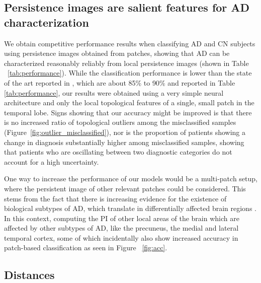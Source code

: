\documentclass{article}
\begin{document}
\subsection{Persistence images are salient features for AD characterization}

We obtain competitive performance results when classifying AD and CN subjects using persistence images obtained from patches, showing that AD can be characterized reasonably reliably from local persistence images (shown in Table ~\ref{tab:performance}). While the classification performance is lower than the state of the art reported in \citep{liu2018anatomical}, which are about 85\% to 90\% and reported in Table \ref{tab:performance}, our results were obtained using a very simple neural architecture and only the local topological features of a single, small patch in the temporal lobe. Signs showing that our accuracy might be improved is that there is no increased ratio of topological outliers among the misclassified samples (Figure~\ref{fig:outlier_misclassified}), nor is the proportion of patients showing a change in diagnosis substantially higher among misclassified samples, showing that patients who are oscillating between two diagnostic categories do not account for a high uncertainty.

One way to increase the performance of our models would be a multi-patch setup, where the persistent image of other relevant patches could be considered. This stems from the fact that there is increasing evidence for the existence of biological subtypes of AD, which translate in differentially affected brain regions \citep{tijms2020pathophysiological,poulakis2018heterogeneous}. In this context, computing the PI of other local areas of the brain which are affected by other subtypes of AD, like the precuneus, the medial and lateral temporal cortex, some of which incidentally also show increased accuracy in patch-based classification as seen in Figure ~\ref{fig:acc}.

\subsection{Distances}\label{sec:disc-dist}

\end{document}
